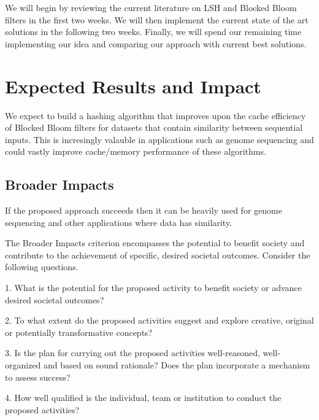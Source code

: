 \documentclass{lxaiproposal}
\begin{document}
  We will begin by reviewing the current literature on LSH and Blocked Bloom filters in the first two weeks. We will then implement the current state of the art solutions
  in the following two weeks. Finally, we will spend our remaining time implementing our idea and comparing our approach with current best solutions.

  
  \section{Expected Results and Impact}

  We expect to build a hashing algorithm that improves upon the cache efficiency of Blocked Bloom filters for datasets that contain similarity between sequential inputs. 
  This is incresingly valauble in applications such as genome sequencing and could vastly improve cache/memory performance of these algorithms.
  
  \subsection{Broader Impacts}
  If the proposed approach succeeds then it can be heavily used for genome sequencing and other applications
  where data has similarity. 
  
  The Broader Impacts criterion encompasses the potential to benefit society and contribute to the achievement of specific, desired societal outcomes. Consider the following questions.
  
  
  1. What is the potential for the proposed activity to benefit society or advance desired societal outcomes?
  
  2. To what extent do the proposed activities suggest and explore creative, original or potentially transformative concepts?
  
  3. Is the plan for carrying out the proposed activities well-reasoned, well-organized and based on sound rationale? Does the plan incorporate a mechanism to assess success?
  
  4. How well qualified is the individual, team or institution to conduct the proposed activities?


  
  
   \printbibliography 
  
  
  
\end{document}
